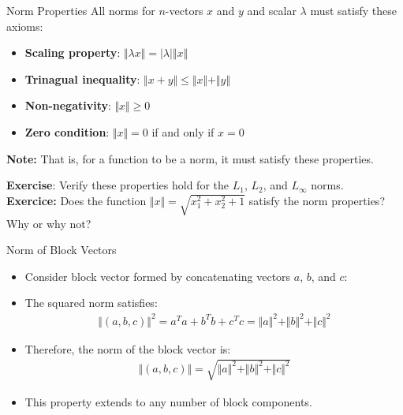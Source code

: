 \begin{frame}{Norm Properties}
All norms for $n$-vectors $x$ and $y$ and scalar $\lambda$ must satisfy these axioms:
\begin{itemize}
    \item \textbf{Scaling property}: $\Vert \lambda x \Vert = \vert \lambda \vert \Vert x \Vert$
    \item \textbf{Trinagual inequality}: $ \Vert x+ y \Vert \leq \Vert x \Vert + \Vert y \Vert$
    \item \textbf{Non-negativity}: $\Vert x \Vert \geq 0$
    \item \textbf{Zero condition}: $\Vert x \Vert = 0$ if and only if $x = 0$
\end{itemize}
\textbf{Note:} That is, for a function to be a norm, it must satisfy these properties.\\

\end{frame}

\begin{frame}
\textbf{Exercise}: Verify these properties hold for the $L_1$, $L_2$, and $L_\infty$ norms.\\
\textbf{Exercice:} Does the function $\Vert x \Vert = \sqrt{x_1^2 + x_2^2 + 1}$ satisfy the norm properties? Why or why not?
\end{frame}



\begin{frame}{Norm of Block Vectors}
\begin{itemize}
    \item Consider block vector formed by concatenating vectors $a$, $b$, and $c$:
    \item The squared norm satisfies:
    \begin{align}
        \Vert (a,b,c) \Vert ^2 = a^Ta + b^T b + c^Tc = \Vert a \Vert ^2 + \Vert b \Vert ^2 + \Vert c \Vert ^2
    \end{align}
    \item Therefore, the norm of the block vector is:
    \begin{align}
        \Vert (a, b, c) \Vert = \sqrt{\Vert a \Vert ^2 + \Vert b \Vert ^2 + \Vert c \Vert ^2}
    \end{align}
    \item This property extends to any number of block components.
\end{itemize}
\end{frame}

